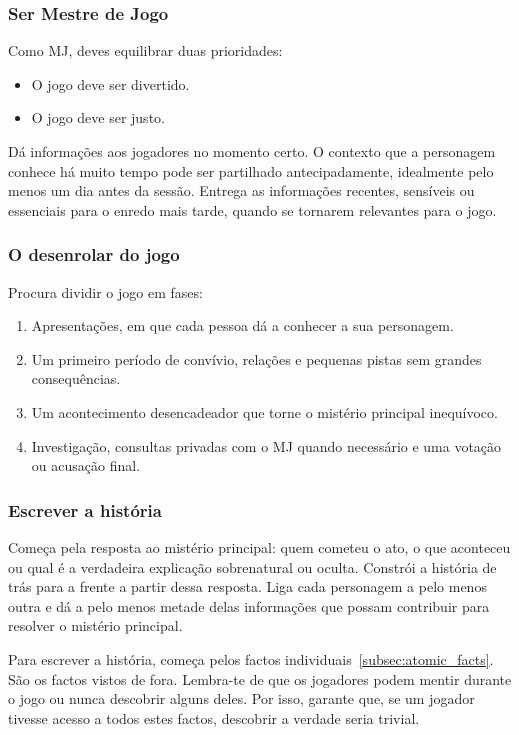 \MMHostGuidanceHeading

\subsubsection{Ser Mestre de Jogo}
Como MJ, deves equilibrar duas prioridades:
\begin{itemize}
  \item O jogo deve ser divertido.
  \item O jogo deve ser justo.
\end{itemize}

Dá informações aos jogadores no momento certo. O contexto que a personagem conhece há muito tempo pode ser partilhado antecipadamente, idealmente pelo menos um dia antes da sessão. Entrega as informações recentes, sensíveis ou essenciais para o enredo mais tarde, quando se tornarem relevantes para o jogo.

\subsubsection{O desenrolar do jogo}
Procura dividir o jogo em fases:
\begin{enumerate}
  \item Apresentações, em que cada pessoa dá a conhecer a sua personagem.
  \item Um primeiro período de convívio, relações e pequenas pistas sem grandes consequências.
  \item Um acontecimento desencadeador que torne o mistério principal inequívoco.
  \item Investigação, consultas privadas com o MJ quando necessário e uma votação ou acusação final.
\end{enumerate}

\subsubsection{Escrever a história}
Começa pela resposta ao mistério principal: quem cometeu o ato, o que aconteceu ou qual é a verdadeira explicação sobrenatural ou oculta. Constrói a história de trás para a frente a partir dessa resposta. Liga cada personagem a pelo menos outra e dá a pelo menos metade delas informações que possam contribuir para resolver o mistério principal.

Para escrever a história, começa pelos factos individuais~\ref{subsec:atomic_facts}. São os factos vistos de fora. Lembra-te de que os jogadores podem mentir durante o jogo ou nunca descobrir alguns deles. Por isso, garante que, se um jogador tivesse acesso a todos estes factos, descobrir a verdade seria trivial.

